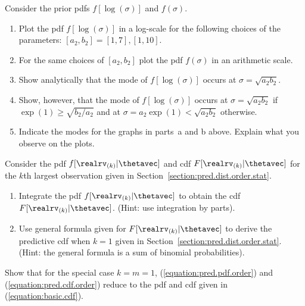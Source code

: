 
\begin{exercise1}
Consider the prior pdfs $f[\log(\sigma)]$
and $f(\sigma)$.
\begin{enumerate}
\item
Plot the pdf $f[\log(\sigma)]$ in a log-scale 
for the following choices of the parameters:
$[a_{2}, b_{2}]=[1,7], [1, 10]$.
\item
For the same choices of $[a_{2}, b_{2}]$
plot the pdf $f(\sigma)$ in an arithmetic 
scale.
\item
Show analytically that the mode of $f[\log(\sigma)]$ occurs at 
$\sigma=\sqrt{a_{2}b_{2}}$.
\item 
Show, however, that the mode of $f[\log(\sigma)]$
occurs at $\sigma=\sqrt{a_{2}b_{2}}$ if 
$\exp(1) \ge \sqrt{b_{2}/a_{2}}$ and at 
$\sigma=a_{2} \exp(1)<\sqrt{a_{2}b_{2}}$ otherwise.
\item
Indicate the modes for the graphs in 
parts~a and b above. Explain what you observe on the
plots.
\end{enumerate}
\end{exercise1}

\begin{exercise1}
Consider the pdf $f[\realrv_{(k)}|\thetavec]$
and cdf $F[\realrv_{(k)}|\thetavec]$
for the 
$k$th largest observation
given in Section~\ref{section:pred.dist.order.stat}.
\begin{enumerate}
\item
Integrate the pdf $f[\realrv_{(k)}|\thetavec]$
to obtain the cdf $F[\realrv_{(k)}|\thetavec]$.
(Hint: use integration by parts).
\item
Use general formula given for $F[\realrv_{(k)}|\thetavec]$
to derive the predictive cdf
when $k=1$ given in Section~\ref{section:pred.dist.order.stat}.
(Hint: the general formula
is a sum of binomial probabilities).
\end{enumerate}
\end{exercise1}

\begin{exercise}
Show that for the special case $k=m=1$,
(\ref{equation:pred.pdf.order}) and  (\ref{equation:pred.cdf.order})
reduce to the pdf and cdf given in (\ref{equation:basic.cdf}).
\end{exercise}

